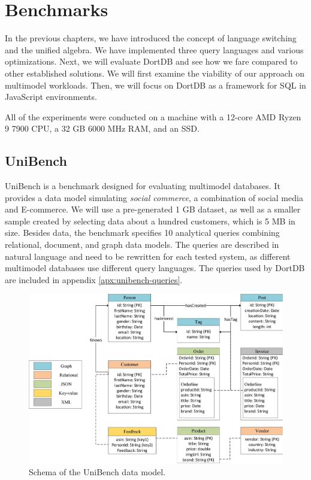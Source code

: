 \chapter{Benchmarks}
\label{chap:benchmarks}


In the previous chapters, we have introduced the concept of language switching and the unified algebra. We have implemented three query languages and various optimizations. Next, we will evaluate DortDB and see how we fare compared to other established solutions. We will first examine the viability of our approach on multimodel workloads. Then, we will focus on DortDB as a framework for SQL in JavaScript environments.

All of the experiments were conducted on a machine with a 12-core AMD Ryzen 9 7900 CPU, a 32 GB 6000 MHz RAM, and an SSD.

\section{UniBench}
\label{sec:unibench}

UniBench\cite{zhang2018unibench} is a benchmark designed for evaluating multimodel databases. It provides a data model simulating \textit{social commerce}, a combination of social media and E-commerce. We will use a pre-generated 1 GB dataset, as well as a smaller sample created by selecting data about a hundred customers, which is 5 MB in size. Besides data, the benchmark specifies 10 analytical queries combining relational, document, and graph data models. The queries are described in natural language and need to be rewritten for each tested system, as different multimodel databases use different query languages. The queries used by DortDB are included in appendix \ref{apx:unibench-queries}.

\begin{figure}[!ht]
    \centering
    \includegraphics[width=\linewidth]{img/unibench-schema.png}
    \caption{Schema of the UniBench data model\cite{zhang2021holistic}.}
\end{figure}

